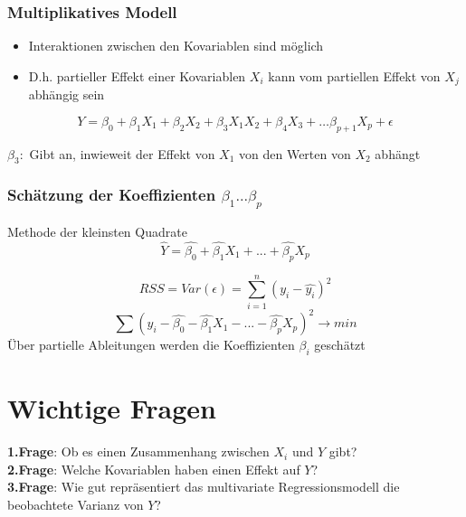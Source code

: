 \subsubsection{Multiplikatives Modell}
\begin{itemize}
	\item Interaktionen zwischen den Kovariablen sind möglich
	\item D.h. partieller Effekt einer Kovariablen $X_i$ kann vom partiellen Effekt von $X_j$ abhängig sein
\end{itemize}
\[Y = \beta_0+ \beta_1X_1 + \beta_2X_2 + \beta_3 X_1X_2 + \beta_4 X_3 +\ldots \beta_{p+1}X_p + \epsilon\]

$\beta_3:$ Gibt an, inwieweit der Effekt von $X_1$ von den Werten von $X_2$ abhängt



\subsubsection{Schätzung der Koeffizienten $\beta_1 ... \beta_p$}
Methode der kleinsten Quadrate
\[\hat{Y} = \hat{\beta_0} + \hat{\beta_1} X_1 + ... + \hat{\beta_p} X_p \]

\[ RSS = Var(\epsilon)= \sum\limits_{i=1}^n (y_i - \hat{y_i} )^2 \]
\[ \sum (y_i - \hat{\beta_0} - \hat{\beta_1} X_1 - ... - \hat{\beta_p} X_p )^2 \rightarrow min \]
Über partielle Ableitungen werden die Koeffizienten $\beta_i$ geschätzt


\section{Wichtige Fragen}
\textbf{1.Frage}: Ob es einen Zusammenhang zwischen $X_i$ und $Y$ gibt? \\
\textbf{2.Frage}: Welche Kovariablen haben einen Effekt auf $Y$? \\
\textbf{3.Frage}: Wie gut repräsentiert das multivariate Regressionsmodell die beobachtete Varianz von $Y$?\\

